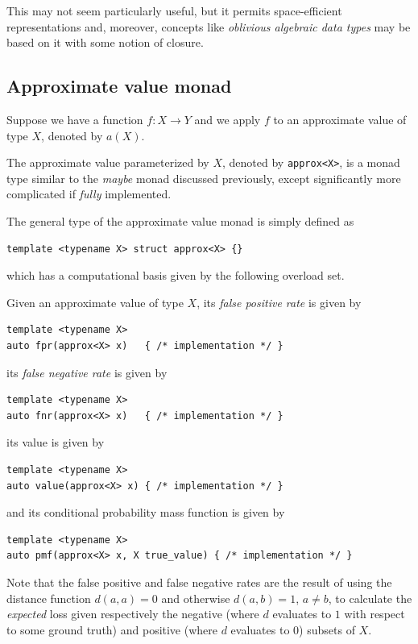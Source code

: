 \documentclass[11pt,final,hidelinks]{article}
\theoremstyle{plain}
\begin{document}
This may not seem particularly useful, but it permits space-efficient representations and, moreover, concepts like \emph{oblivious algebraic data types} may be based on it with some notion of closure.

\subsection{Approximate value monad}

Suppose we have a function $f : X \to Y$ and we apply $f$ to an approximate value of type $X$, denoted by $a(X)$.

The approximate value parameterized by $X$, denoted by \lstinline{approx<X>}, is a monad type similar to the \emph{maybe} monad discussed previously, except significantly more complicated if \emph{fully} implemented.

The general type of the approximate value monad is simply defined as
\begin{lstlisting}
template <typename X> struct approx<X> {}
\end{lstlisting}
which has a computational basis given by the following overload set.

Given an approximate value of type $X$, its \emph{false positive rate} is given by
\begin{lstlisting}
template <typename X>
auto fpr(approx<X> x)   { /* implementation */ }
\end{lstlisting}
its \emph{false negative rate} is given by
\begin{lstlisting}
template <typename X>
auto fnr(approx<X> x)   { /* implementation */ }
\end{lstlisting}
its value is given by
\begin{lstlisting}
template <typename X>
auto value(approx<X> x) { /* implementation */ }
\end{lstlisting}
and its conditional probability mass function is given by
\begin{lstlisting}
template <typename X>
auto pmf(approx<X> x, X true_value) { /* implementation */ }
\end{lstlisting}

Note that the false positive and false negative rates are the result of using the distance function $d(a,a) = 0$ and otherwise $d(a,b) = 1$, $a \neq b$, to calculate the \emph{expected} loss given respectively the negative (where $d$ evaluates to $1$ with respect to some ground truth) and positive (where $d$ evaluates to $0$) subsets of $X$.
\end{document}
